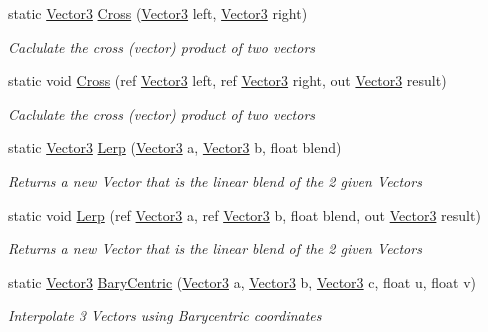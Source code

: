 \begin{DoxyCompactItemize}
static \hyperlink{struct_open_t_k_1_1_vector3}{Vector3} \hyperlink{struct_open_t_k_1_1_vector3_a9deb7c0a07c1dc50185bb606bb50a9d2}{Cross} (\hyperlink{struct_open_t_k_1_1_vector3}{Vector3} left, \hyperlink{struct_open_t_k_1_1_vector3}{Vector3} right)
\begin{DoxyCompactList}\small\item\em Caclulate the cross (vector) product of two vectors \end{DoxyCompactList}\item 
static void \hyperlink{struct_open_t_k_1_1_vector3_acc1443eb0e8cb4ba8bb51314ab4f081f}{Cross} (ref \hyperlink{struct_open_t_k_1_1_vector3}{Vector3} left, ref \hyperlink{struct_open_t_k_1_1_vector3}{Vector3} right, out \hyperlink{struct_open_t_k_1_1_vector3}{Vector3} result)
\begin{DoxyCompactList}\small\item\em Caclulate the cross (vector) product of two vectors \end{DoxyCompactList}\item 
static \hyperlink{struct_open_t_k_1_1_vector3}{Vector3} \hyperlink{struct_open_t_k_1_1_vector3_a093e55fc28b96e667c11ab880acc22c1}{Lerp} (\hyperlink{struct_open_t_k_1_1_vector3}{Vector3} a, \hyperlink{struct_open_t_k_1_1_vector3}{Vector3} b, float blend)
\begin{DoxyCompactList}\small\item\em Returns a new Vector that is the linear blend of the 2 given Vectors \end{DoxyCompactList}\item 
static void \hyperlink{struct_open_t_k_1_1_vector3_a0aa8d38bc0693466c3fafae8f3f5567f}{Lerp} (ref \hyperlink{struct_open_t_k_1_1_vector3}{Vector3} a, ref \hyperlink{struct_open_t_k_1_1_vector3}{Vector3} b, float blend, out \hyperlink{struct_open_t_k_1_1_vector3}{Vector3} result)
\begin{DoxyCompactList}\small\item\em Returns a new Vector that is the linear blend of the 2 given Vectors \end{DoxyCompactList}\item 
static \hyperlink{struct_open_t_k_1_1_vector3}{Vector3} \hyperlink{struct_open_t_k_1_1_vector3_a9324bea2c2eb486f7054c20360c532e3}{Bary\-Centric} (\hyperlink{struct_open_t_k_1_1_vector3}{Vector3} a, \hyperlink{struct_open_t_k_1_1_vector3}{Vector3} b, \hyperlink{struct_open_t_k_1_1_vector3}{Vector3} c, float u, float v)
\begin{DoxyCompactList}\small\item\em Interpolate 3 Vectors using Barycentric coordinates \end{DoxyCompactList}\item 

\end{DoxyCompactItemize}
